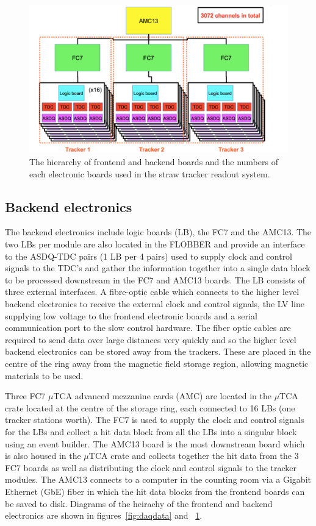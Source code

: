 \begin{figure}[th]
\centering
\includegraphics[scale=0.7]{Figures/daqdatachain}
\decoRule
\caption{The hierarchy of frontend and backend boards and the numbers of each electronic boards used in the straw tracker readout system.}
\label{fig:daqdatachain}
\end{figure}

\subsection{Backend electronics}

The backend electronics include logic boards (LB), the FC7 and the AMC13. The two LBs per module are also located in the FLOBBER and provide an interface to the ASDQ-TDC pairs (1 LB per 4 pairs) used to supply clock and control signals to the TDC's and gather the information together into a single data block to be processed downstream in the FC7 and AMC13 boards. The LB consists of three external interfaces. A fibre-optic cable which connects to the higher level backend electronics to receive the external clock and control signals, the LV line supplying low voltage to the frontend electronic boards and a serial communication port to the slow control hardware. The fiber optic cables are required to send data over large distances very quickly and so the higher level backend electronics can be stored away from the trackers. These are placed in the centre of the ring away from the magnetic field storage region, allowing magnetic materials to be used.

Three FC7 $\mu$TCA advanced mezzanine cards (AMC) are located in the $\mu$TCA crate located at the centre of the storage ring, each connected to 16 LBs (one tracker stations worth). The FC7 is used to supply the clock and control signals for the LBs and collect a hit data block from all the LBs into a singular block using an event builder. The AMC13 board is the most downstream board which is also housed in the $\mu$TCA crate and collects together the hit data from the 3 FC7 boards as well as distributing the clock and control signals to the tracker modules. The AMC13 connects to a computer in the counting room via a Gigabit Ethernet (GbE) fiber in which the hit data blocks from the frontend boards can be saved to disk. Diagrams of the heirachy of the frontend and backend electronics are shown in figures~\ref{fig:daqdata} and ~\ref{fig:daqdatachain}.

